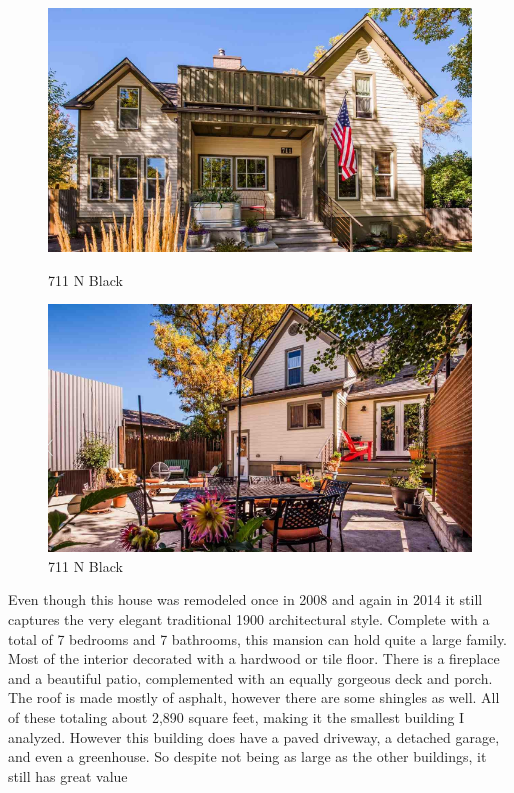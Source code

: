 \documentclass[10pt,letterpaper]{article}
\begin{document}
\begin{figure}
	\centering
		\begin{minipage}[b]{0.4\textwidth}
			\includegraphics[width=\textwidth]{house3pic1.png}
    		\caption{711 N Black}
  		\end{minipage}
  \hfill
  		\begin{minipage}[b]{0.4\textwidth}
    		\includegraphics[width=\textwidth]{house3pic2.png}
    		\caption{711 N Black}
  		\end{minipage}
\end{figure}

Even though this house was remodeled once in 2008 and again in 2014 it still captures the very elegant traditional 1900 architectural style. Complete with a total of 7 bedrooms and 7 bathrooms, this mansion can hold quite a large family. Most of the interior decorated with a hardwood or tile floor. There is a fireplace and a beautiful patio, complemented with an equally gorgeous deck and porch. The roof is made mostly of asphalt, however there are some shingles as well. All of these totaling about 2,890 square feet, making it the smallest building I analyzed. However this building does have a paved driveway, a detached garage, and even a greenhouse. So despite not being as large as the other buildings, it still has great value
\end{document}
